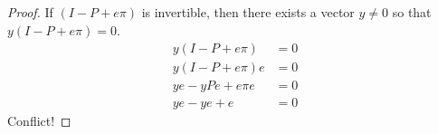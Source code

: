 \documentclass[runningheads]{llncs}
\begin{document}
    \subsection{}
    \begin{proof}
        If $(I - P + e\pi)$ is invertible, then there exists a vector $y \neq 0$ so that
        $y (I - P + e\pi) = 0$.
        \begin{align}
            y(I - P + e\pi) &= 0 \\
            y(I - P + e\pi)e &= 0 \\
            ye - yPe + e\pi e &= 0 \\
            ye - ye + e &= 0
        \end{align}
        Conflict!
    \end{proof}

    
\end{document}
